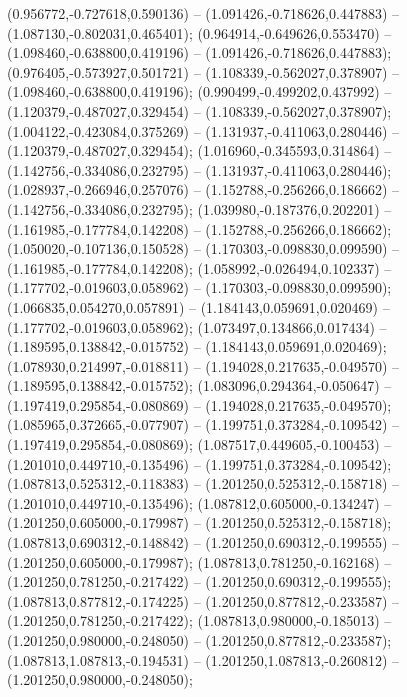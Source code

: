  (0.956772,-0.727618,0.590136) -- (1.091426,-0.718626,0.447883) -- (1.087130,-0.802031,0.465401);
 (0.964914,-0.649626,0.553470) -- (1.098460,-0.638800,0.419196) -- (1.091426,-0.718626,0.447883);
 (0.976405,-0.573927,0.501721) -- (1.108339,-0.562027,0.378907) -- (1.098460,-0.638800,0.419196);
 (0.990499,-0.499202,0.437992) -- (1.120379,-0.487027,0.329454) -- (1.108339,-0.562027,0.378907);
 (1.004122,-0.423084,0.375269) -- (1.131937,-0.411063,0.280446) -- (1.120379,-0.487027,0.329454);
 (1.016960,-0.345593,0.314864) -- (1.142756,-0.334086,0.232795) -- (1.131937,-0.411063,0.280446);
 (1.028937,-0.266946,0.257076) -- (1.152788,-0.256266,0.186662) -- (1.142756,-0.334086,0.232795);
 (1.039980,-0.187376,0.202201) -- (1.161985,-0.177784,0.142208) -- (1.152788,-0.256266,0.186662);
 (1.050020,-0.107136,0.150528) -- (1.170303,-0.098830,0.099590) -- (1.161985,-0.177784,0.142208);
 (1.058992,-0.026494,0.102337) -- (1.177702,-0.019603,0.058962) -- (1.170303,-0.098830,0.099590);
 (1.066835,0.054270,0.057891) -- (1.184143,0.059691,0.020469) -- (1.177702,-0.019603,0.058962);
 (1.073497,0.134866,0.017434) -- (1.189595,0.138842,-0.015752) -- (1.184143,0.059691,0.020469);
 (1.078930,0.214997,-0.018811) -- (1.194028,0.217635,-0.049570) -- (1.189595,0.138842,-0.015752);
 (1.083096,0.294364,-0.050647) -- (1.197419,0.295854,-0.080869) -- (1.194028,0.217635,-0.049570);
 (1.085965,0.372665,-0.077907) -- (1.199751,0.373284,-0.109542) -- (1.197419,0.295854,-0.080869);
 (1.087517,0.449605,-0.100453) -- (1.201010,0.449710,-0.135496) -- (1.199751,0.373284,-0.109542);
 (1.087813,0.525312,-0.118383) -- (1.201250,0.525312,-0.158718) -- (1.201010,0.449710,-0.135496);
 (1.087812,0.605000,-0.134247) -- (1.201250,0.605000,-0.179987) -- (1.201250,0.525312,-0.158718);
 (1.087813,0.690312,-0.148842) -- (1.201250,0.690312,-0.199555) -- (1.201250,0.605000,-0.179987);
 (1.087813,0.781250,-0.162168) -- (1.201250,0.781250,-0.217422) -- (1.201250,0.690312,-0.199555);
 (1.087813,0.877812,-0.174225) -- (1.201250,0.877812,-0.233587) -- (1.201250,0.781250,-0.217422);
 (1.087813,0.980000,-0.185013) -- (1.201250,0.980000,-0.248050) -- (1.201250,0.877812,-0.233587);
 (1.087813,1.087813,-0.194531) -- (1.201250,1.087813,-0.260812) -- (1.201250,0.980000,-0.248050);
